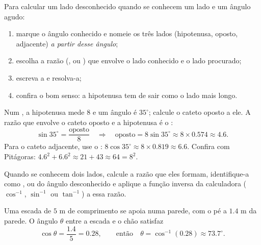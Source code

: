 \begin{method}\label{met:g9:trig:side}
Para calcular um lado desconhecido quando se conhecem um lado e um
ângulo agudo:
\begin{enumerate}
  \item marque o ângulo conhecido e nomeie os três lados (hipotenusa,
        oposto, adjacente) \emph{a partir desse ângulo};
  \item escolha a razão (,  ou ) que envolve o lado
        conhecido e o lado procurado;
  \item escreva a  e resolva-a;
  \item confira o bom senso: a hipotenusa tem de sair como o lado mais
        longo.
\end{enumerate}
\end{method}

\begin{example}\label{ex:g9:trig:side}
Num , a hipotenusa mede $8$ e um ângulo é
$35^\circ$; calcule o cateto oposto a ele. A razão que envolve o cateto
oposto e a hipotenusa é o :
\[
\sin 35^\circ = \frac{\text{oposto}}{8}
\quad\Longrightarrow\quad
\text{oposto} = 8 \sin 35^\circ \approx 8 \times 0.574 \approx 4.6 .
\]
Para o cateto adjacente, use o :
$8\cos 35^\circ \approx 8 \times 0.819 \approx 6.6$. Confira com
Pitágoras: $4.6^2 + 6.6^2 \approx 21 + 43 \approx 64 = 8^2$.
\end{example}

\begin{method}\label{met:g9:trig:angle}
Quando se conhecem dois lados, calcule a razão que eles formam,
identifique-a como ,  ou  do ângulo desconhecido e
aplique a função inversa da calculadora ($\cos^{-1}$, $\sin^{-1}$ ou
$\tan^{-1}$) a essa razão.
\end{method}

\begin{example}\label{ex:g9:trig:angle}
Uma escada de $5$ m de comprimento se apoia numa parede, com o pé a
$1.4$ m da parede. O ângulo $\theta$ entre a escada e o chão satisfaz
\[
\cos\theta = \frac{1.4}{5} = 0.28,
\qquad\text{então}\quad
\theta = \cos^{-1}(0.28) \approx 73.7^\circ .
\]
\end{example}

